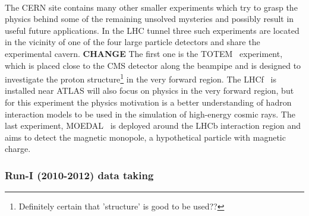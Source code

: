 \\
The CERN site contains many other smaller experiments which try to grasp the physics behind some of the remaining unsolved mysteries and possibly result in useful future applications. In the LHC tunnel three such experiments are located in the vicinity of one of the four large particle detectors and share the experimental cavern. \textbf{CHANGE}
The first one is the TOTEM~\cite{} %
experiment, which is placed close to the CMS detector along the beampipe and is designed to investigate the proton structure\footnote{Definitely certain that 'structure' is good to be used??} in the very forward region. The LHCf~\cite{} %
is installed near ATLAS will also focus on physics in the very forward region, but for this experiment the physics motivation is a better understanding of hadron interaction models to be used in the simulation of high-energy cosmic rays.
The last experiment, MOEDAL~\cite{} %
is deployed around the LHCb interaction region and aims to detect the magnetic monopole, a hypothetical particle with magnetic charge.

\subsubsection{Run-I (2010-2012) data taking}

